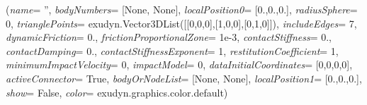 %
\begin{flushleft}
\label{sec:mainsystemextensions:CreateSphereTriangleContact}
({\it name}= '', {\it bodyNumbers}= [None, None], {\it localPosition0}= [0.,0.,0.], {\it radiusSphere}= 0, {\it trianglePoints}= exudyn.Vector3DList([[0,0,0],[1,0,0],[0,1,0]]), {\it includeEdges}= 7, {\it dynamicFriction}= 0., {\it frictionProportionalZone}= 1e-3, {\it contactStiffness}= 0., {\it contactDamping}= 0., {\it contactStiffnessExponent}= 1, {\it restitutionCoefficient}= 1, {\it minimumImpactVelocity}= 0, {\it impactModel}= 0, {\it dataInitialCoordinates}= [0,0,0,0], {\it activeConnector}= True, {\it bodyOrNodeList}= [None, None], {\it localPosition1}= [0.,0.,0.], {\it show}= False, {\it color}= exudyn.graphics.color.default)
\end{flushleft}
\setlength{\itemindent}{0.7cm}
